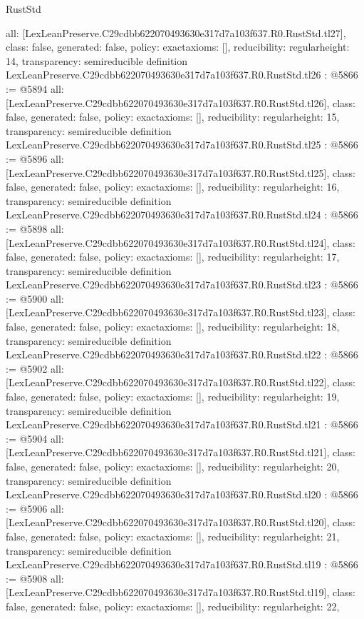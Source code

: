 \begin{lexlean}{RustStd}
\begin{coremodule}
{  all: [LexLeanPreserve.C29cdbb622070493630e317d7a103f637.R0.RustStd.tl27],
  class: false,
  generated: false,
  policy: exact{axioms: []},
  reducibility: regular{height: 14},
  transparency: semireducible
}
definition LexLeanPreserve.C29cdbb622070493630e317d7a103f637.R0.RustStd.tl26 : @5866 := @5894 {
  all: [LexLeanPreserve.C29cdbb622070493630e317d7a103f637.R0.RustStd.tl26],
  class: false,
  generated: false,
  policy: exact{axioms: []},
  reducibility: regular{height: 15},
  transparency: semireducible
}
definition LexLeanPreserve.C29cdbb622070493630e317d7a103f637.R0.RustStd.tl25 : @5866 := @5896 {
  all: [LexLeanPreserve.C29cdbb622070493630e317d7a103f637.R0.RustStd.tl25],
  class: false,
  generated: false,
  policy: exact{axioms: []},
  reducibility: regular{height: 16},
  transparency: semireducible
}
definition LexLeanPreserve.C29cdbb622070493630e317d7a103f637.R0.RustStd.tl24 : @5866 := @5898 {
  all: [LexLeanPreserve.C29cdbb622070493630e317d7a103f637.R0.RustStd.tl24],
  class: false,
  generated: false,
  policy: exact{axioms: []},
  reducibility: regular{height: 17},
  transparency: semireducible
}
definition LexLeanPreserve.C29cdbb622070493630e317d7a103f637.R0.RustStd.tl23 : @5866 := @5900 {
  all: [LexLeanPreserve.C29cdbb622070493630e317d7a103f637.R0.RustStd.tl23],
  class: false,
  generated: false,
  policy: exact{axioms: []},
  reducibility: regular{height: 18},
  transparency: semireducible
}
definition LexLeanPreserve.C29cdbb622070493630e317d7a103f637.R0.RustStd.tl22 : @5866 := @5902 {
  all: [LexLeanPreserve.C29cdbb622070493630e317d7a103f637.R0.RustStd.tl22],
  class: false,
  generated: false,
  policy: exact{axioms: []},
  reducibility: regular{height: 19},
  transparency: semireducible
}
definition LexLeanPreserve.C29cdbb622070493630e317d7a103f637.R0.RustStd.tl21 : @5866 := @5904 {
  all: [LexLeanPreserve.C29cdbb622070493630e317d7a103f637.R0.RustStd.tl21],
  class: false,
  generated: false,
  policy: exact{axioms: []},
  reducibility: regular{height: 20},
  transparency: semireducible
}
definition LexLeanPreserve.C29cdbb622070493630e317d7a103f637.R0.RustStd.tl20 : @5866 := @5906 {
  all: [LexLeanPreserve.C29cdbb622070493630e317d7a103f637.R0.RustStd.tl20],
  class: false,
  generated: false,
  policy: exact{axioms: []},
  reducibility: regular{height: 21},
  transparency: semireducible
}
definition LexLeanPreserve.C29cdbb622070493630e317d7a103f637.R0.RustStd.tl19 : @5866 := @5908 {
  all: [LexLeanPreserve.C29cdbb622070493630e317d7a103f637.R0.RustStd.tl19],
  class: false,
  generated: false,
  policy: exact{axioms: []},
  reducibility: regular{height: 22},
}
\end{coremodule}
\end{lexlean}
